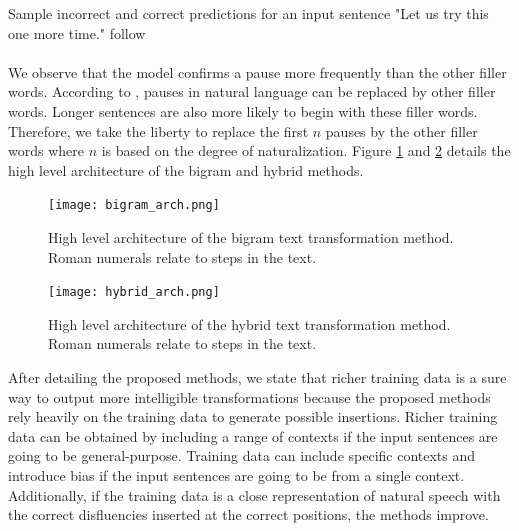 \documentclass[journal]{IEEEtran}
\begin{document}
Sample incorrect and correct predictions for an input sentence "Let us try this one more time." follow
\noindent{}
\\
\noindent{}
\\

We observe that the model confirms a pause more frequently than the other filler words. According to \cite{cognition}, pauses in natural language can be replaced by other filler words. Longer sentences are also more likely to begin with these filler words. Therefore, we take the liberty to replace the first $n$ pauses by the other filler words where $n$ is based on the degree of naturalization. Figure \ref{fig3} and \ref{fig4} details the high level architecture of the bigram and hybrid methods.

\begin{figure}
\centerline{\texttt{[image: bigram\_arch.png]}}
\caption{High level architecture of the bigram text transformation method. Roman numerals relate to steps in the text.}
\label{fig3}
\end{figure}

\begin{figure}
\centerline{\texttt{[image: hybrid\_arch.png]}}
\caption{High level architecture of the hybrid text transformation method. Roman numerals relate to steps in the text.}
\label{fig4}
\end{figure}

After detailing the proposed methods, we state that richer training data is a sure way to output more intelligible transformations because the proposed methods rely heavily on the training data to generate possible insertions. Richer training data can be obtained by including a range of contexts if the input sentences are going to be general-purpose. Training data can include specific contexts and introduce bias if the input sentences are going to be from a single context. Additionally, if the training data is a close representation of natural speech with the correct disfluencies inserted at the correct positions, the methods improve. 
\end{document}
